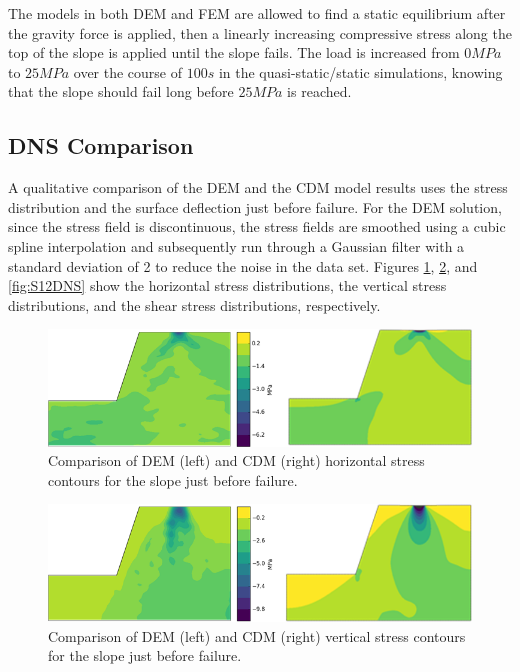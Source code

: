 The models in both DEM and FEM are allowed to find a static equilibrium after the gravity force is applied, then a linearly increasing compressive stress along the top of the slope is applied until the slope fails. The load is increased from $0MPa$ to $25 MPa$ over the course of $100s$ in the quasi-static/static simulations, knowing that the slope should fail long before $25MPa$ is reached.

\subsection{DNS Comparison}

A qualitative comparison of the DEM and the CDM model results uses the stress distribution and the surface deflection just before failure. For the DEM solution, since the stress field is discontinuous, the stress fields are smoothed using a cubic spline interpolation and subsequently run through a Gaussian filter with a standard deviation of 2 to reduce the noise in the data set. Figures \ref{fig:S11DNS}, \ref{fig:S22DNS}, and \ref{fig:S12DNS} show the horizontal stress distributions, the vertical stress distributions, and the shear stress distributions, respectively.

\begin{figure}[!htb]
\begin{center}
\includegraphics[width=\textwidth]{figures/Chapter5/HorizontalStressContours}
\caption{{\label{fig:S11DNS} Comparison of DEM (left) and CDM (right) horizontal stress contours for the slope just before failure.%
}}
\end{center}
\end{figure}

\begin{figure}[!htb]
\begin{center}
\includegraphics[width=\textwidth]{figures/Chapter5/VerticalStressContours}
\caption{{\label{fig:S22DNS} Comparison of DEM (left) and CDM (right) vertical stress contours for the slope just before failure.%
}}
\end{center}
\end{figure}

